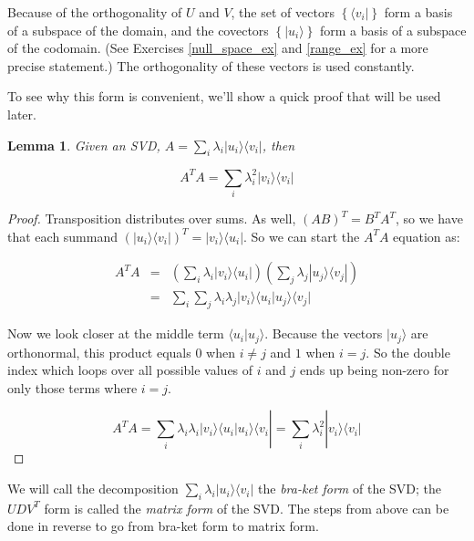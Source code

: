 \documentclass{amsbook}
\newtheorem{lemma}[theorem]{Lemma}
\begin{document}
Because of the orthogonality of $U$ and $V$, the set of vectors $\left\{\langle v _i|\right\}$ form a basis of a subspace of the domain, and the covectors $\left\{| u_i \rangle\right\}$ form a basis of a subspace of the codomain.  (See Exercises \ref{null_space_ex} and \ref{range_ex} for a more precise statement.)  The orthogonality of these vectors is used constantly.

To see why this form is convenient, we'll show a quick proof that will be used later.

\begin{lemma}
\label{ata_eq}
Given an SVD, $A=\sum_i\lambda_i|u_i\rangle\langle v_i|$, then 

\begin{equation}
\label{ata_simplified}
A^TA=\sum_i\lambda_i^2|v_i\rangle\langle v_i|
\end{equation}
\end{lemma}

\begin{proof}
Transposition distributes over sums.  As well, $(AB)^T=B^TA^T$, so we have that each summand $\left(|u_i\rangle\langle v_i|\right)^T=|v_i\rangle\langle u_i|$.  So we can start the $A^TA$ equation as:

$$
\begin{array}{rcl}
A^TA&=& \left(\sum_i\lambda_i|v_i\rangle\langle u_i|\right) \left(\sum_j\lambda_j|u_j\rangle\langle v_j|\right) \\
&=&\sum_i\sum_j\lambda_i\lambda_j|v_i\rangle\langle u_i|u_j\rangle\langle v_j|
\end{array}
$$

Now we look closer at the middle term $\langle u_i|u_j\rangle$.  Because the vectors $|u_j\rangle$ are orthonormal, this product equals $0$ when $i\neq j$ and $1$ when $i=j$.  So the double index which loops over all possible values of $i$ and $j$ ends up being non-zero for only those terms where $i=j$.

$$
A^TA = \sum_i\lambda_i\lambda_i|v_i\rangle\langle u_i|u_i\rangle\langle v_i| = \sum_i\lambda_i^2|v_i\rangle\langle v_i|
$$
\end{proof}

We will call the decomposition $\sum_i\lambda_i|u_i\rangle\langle v_i|$ the {\it bra-ket form} of the SVD; the $UDV^T$ form is called the {\it matrix form} of the SVD.  The steps from above can be done in reverse to go from bra-ket form to matrix form.
\end{document}
